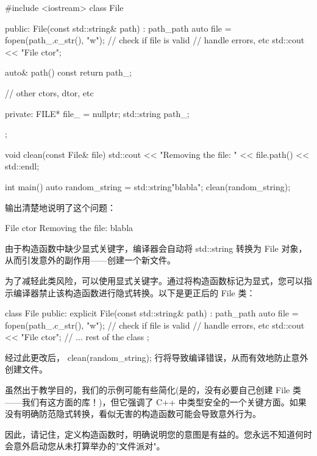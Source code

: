 \begin{cpp}
#include <iostream>
class File {
public:
    File(const std::string& path) : path_{path} {
        auto file = fopen(path_.c_str(), "w");
        // check if file is valid
        // handle errors, etc
        std::cout << "File ctor\n";
    }

    auto& path() const {
        return path_;
    }

    // other ctors, dtor, etc

private:
    FILE* file_ = nullptr;
    std::string path_;
};

void clean(const File& file) {
    std::cout << "Removing the file: " << file.path() << std::endl;
}

int main() {
    auto random_string = std::string{"blabla"};
    clean(random_string);
}
\end{cpp}

输出清楚地说明了这个问题：

\begin{shell}
File ctor
Removing the file: blabla
\end{shell}

由于构造函数中缺少显式关键字，编译器会自动将 std::string 转换为 File 对象，从而引发意外的副作用——创建一个新文件。


为了减轻此类风险，可以使用显式关键字。通过将构造函数标记为显式，您可以指示编译器禁止该构造函数进行隐式转换。以下是更正后的 File 类：

\begin{cpp}
class File {
    public:
    explicit File(const std::string& path) : path_{path} {
        auto file = fopen(path_.c_str(), "w");
        // check if file is valid
        // handle errors, etc
        std::cout << "File ctor\n";
    }
    // ... rest of the class
};
\end{cpp}

经过此更改后， clean(random\_string); 行将导致编译错误，从而有效地防止意外创建文件。


虽然出于教学目的，我们的示例可能有些简化(是的，没有必要自己创建 File 类——我们有这方面的库！)，但它强调了 C++ 中类型安全的一个关键方面。如果没有明确防范隐式转换，看似无害的构造函数可能会导致意外行为。

因此，请记住，定义构造函数时，明确说明您的意图是有益的。您永远不知道何时会意外启动您从未打算举办的"文件派对"。















